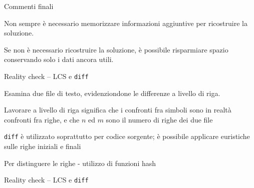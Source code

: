 \begin{frame}{Commenti finali}

\vspace{-9pt}
\begin{myboxtitle}
Non sempre è necessario memorizzare informazioni aggiuntive per ricostruire la soluzione.
\end{myboxtitle}

\begin{myboxtitle}
Se non è necessario ricostruire la soluzione, è possibile risparmiare spazio conservando solo i dati ancora utili.
\end{myboxtitle}


\end{frame}

\begin{frame}{Reality check -- LCS e \texttt{diff}  }

\vspace{-9pt}
\BIL
\item Esamina due file di testo, evidenziondone le differenze a livello di riga. 
\item Lavorare \alert{a livello di riga} significa che i confronti fra simboli sono in realtà confronti fra righe, e che $n$ ed $m$ sono il numero di righe dei due file
\EIL

\BIL
\item \texttt{diff} è utilizzato soprattutto per codice sorgente; è possibile applicare euristiche sulle righe iniziali e finali
\item Per distinguere le righe - utilizzo di funzioni hash
\EIL

\end{frame}

\begin{frame}{Reality check -- LCS e \texttt{diff}  }

\vspace{-9pt}

\end{frame}







